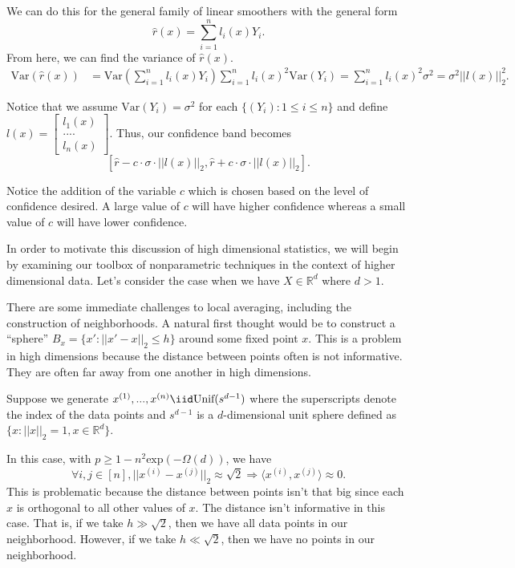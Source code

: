 We can do this for the general family of linear smoothers with the general form
$$
\hat{r}(x) = \sum_{i=1}^n l_i(x)Y_i.
$$
From here, we can find the variance of $\hat{r}(x)$.
\begin{align*}
    \text{Var}(\hat{r}(x)) &= \text{Var}\left( \sum_{i=1}^n l_i(x)Y_i \right) \sum_{i=1}^n l_i(x)^2 \text{Var}(Y_i) = \sum_{i=1}^n l_i(x)^2 \sigma^2 = \sigma^2 ||l(x)||_2^2.
\end{align*}

\noindent Notice that we assume $\text{Var}(Y_i) = \sigma^2$ for each $\{(Y_i) : 1 \leq i \leq n\}$ and define $l(x) = \begin{bmatrix} l_1(x) \\ .... \\ l_n(x) \end{bmatrix}$. Thus, our confidence band becomes
$$
[\hat{r} - c \cdot \sigma \cdot ||l(x)||_2, \hat{r} + c \cdot \sigma \cdot ||l(x)||_2].
$$

\noindent Notice the addition of the variable $c$ which is chosen based on the level of confidence desired. A large value of $c$ will have higher confidence whereas a small value of $c$ will have lower confidence.

In order to motivate this discussion of high dimensional statistics, we will begin by examining our toolbox of nonparametric techniques in the context of higher dimensional data. Let's consider the case when we have $X \in \mathbb{R}^d$ where $d > 1$. 

There are some immediate challenges to local averaging, including the construction of neighborhoods. A natural first thought would be to construct a ``sphere'' $B_x = \{x' : ||x' - x||_2 \leq h\}$ around some fixed point $x$. This is a problem in high dimensions because the distance between points often is not informative. They are often far away from one another in high dimensions.


\begin{example}
Suppose we generate $x^{(1)}, ..., x^{(n)} \iid \text{Unif}(s^{d-1})$ where the superscripts denote the index of the data points and $s^{d-1}$ is a $d$-dimensional unit sphere defined as $\{x : ||x||_2 = 1, x \in \mathbb{R}^d\}$. 
\end{example}
In this case, with $p \geq 1 - n^2\text{exp}(-\Omega(d))$, we have
$$
\forall i, j \in [n], ||x^{(i)} - x^{(j)}||_2 \approx \sqrt{2} \Rightarrow \langle x^{(i)}, x^{(j)} \rangle \approx 0.
$$
This is problematic because the distance between points isn't that big since each $x$ is orthogonal to all other values of $x$. The distance isn't informative in this case. That is, if we take $h \gg \sqrt{2}$, then we have all data points in our neighborhood. However, if we take $h \ll \sqrt{2}$, then we have no points in our neighborhood.

